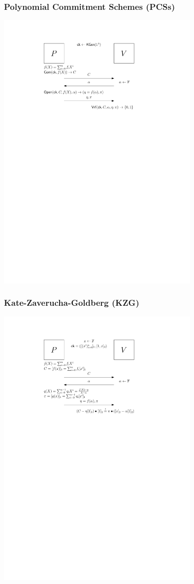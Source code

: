 \documentclass[9pt]{beamer}
\begin{document}
\begin{frame}
\frametitle{Polynomial Commitment Schemes (PCSs)}
    \includegraphics[width=10cm]{pcs-definition.pdf}
\end{frame}


\begin{frame}
\frametitle{Kate-Zaverucha-Goldberg (KZG)}
    \includegraphics[width=10cm]{kzg.pdf}
\end{frame}
\end{document}
